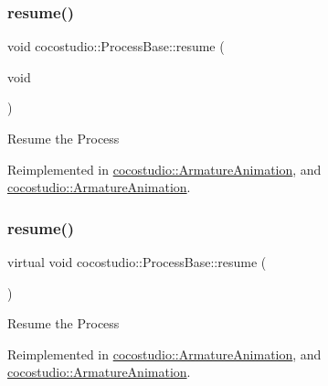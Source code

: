 \subsubsection{\texorpdfstring{resume()}{resume()}\hspace{0.1cm}{\footnotesize\ttfamily [1/2]}}
{\footnotesize\ttfamily void cocostudio\+::\+Process\+Base\+::resume (\begin{DoxyParamCaption}\item[{void}]{ }\end{DoxyParamCaption})\hspace{0.3cm}{\ttfamily [virtual]}}

Resume the Process 

Reimplemented in \hyperlink{classcocostudio_1_1ArmatureAnimation_a79accb8d66ca70de4c5587b0018070b1}{cocostudio\+::\+Armature\+Animation}, and \hyperlink{classcocostudio_1_1ArmatureAnimation_ae57f2ee86afc4029b18aff18fda7d96d}{cocostudio\+::\+Armature\+Animation}.

\mbox{\label{classcocostudio_1_1ProcessBase_a0e30744d874e0332e156318d21abaa5a}} 
\subsubsection{\texorpdfstring{resume()}{resume()}\hspace{0.1cm}{\footnotesize\ttfamily [2/2]}}
{\footnotesize\ttfamily virtual void cocostudio\+::\+Process\+Base\+::resume (\begin{DoxyParamCaption}{ }\end{DoxyParamCaption})\hspace{0.3cm}{\ttfamily [virtual]}}

Resume the Process 

Reimplemented in \hyperlink{classcocostudio_1_1ArmatureAnimation_a79accb8d66ca70de4c5587b0018070b1}{cocostudio\+::\+Armature\+Animation}, and \hyperlink{classcocostudio_1_1ArmatureAnimation_ae57f2ee86afc4029b18aff18fda7d96d}{cocostudio\+::\+Armature\+Animation}.

\mbox{\label{classcocostudio_1_1ProcessBase_a1bc5907ac5300d031f2a3ab6d1ed2718}} 
